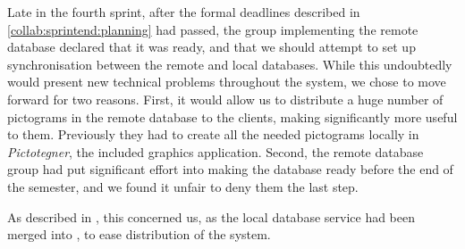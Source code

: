 Late in the fourth sprint, after the formal deadlines described in \cref{collab:sprintend:planning} had passed, the group implementing the remote database declared that it was ready, and that we should attempt to set up synchronisation between the remote and local databases. 
While this undoubtedly would present new technical problems throughout the system, we chose to move forward for two reasons. 
First, it would allow us to distribute a huge number of pictograms in the remote database to the clients, making \giraf significantly more useful to them.
Previously they had to create all the needed pictograms locally in \textit{Pictotegner}, the included graphics application. 
Second, the remote database group had put significant effort into making the database ready before the end of the semester, and we found it unfair to deny them the last step. 

As described in , this concerned us, as the local database service had been merged into \launcher, to ease distribution of the system.

